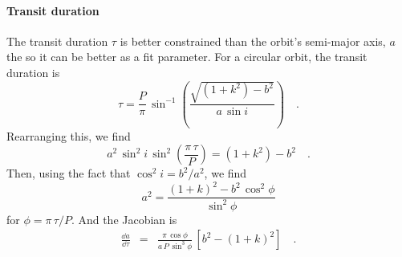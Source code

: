 \paragraph{Transit duration}
The transit duration $\tau$ is better constrained than the orbit's semi-major axis, $a$ the so it can be better as a fit parameter.
For a circular orbit, the transit duration is \citep{Winn:2010}
\begin{equation}
  \tau = \frac{P}{\pi}\,\sin^{-1}\left( \frac{\sqrt{(1 + k^2) - b^2}}{a\,\sin i} \right) \quad.
\end{equation}
Rearranging this, we find
\begin{equation}
  a^2\,\sin^2 i\,\sin^2\left(\frac{\pi\,\tau}{P}\right) = (1 + k^2) - b^2 \quad.
\end{equation}
Then, using the fact that $\cos^2 i = b^2 / a^2$, we find
\begin{equation}
  a^2 = \frac{(1 + k)^2 - b^2\,\cos^2\phi}{\sin^2\phi}
\end{equation}
for $\phi = \pi\,\tau / P$.
And the Jacobian is
\begin{eqnarray}
  \frac{\dd a}{\dd \tau} &=& \frac{\pi\,\cos \phi}{a\,P\,\sin^3 \phi}\,\left[b^2 - (1 + k)^2\right] \quad.
\end{eqnarray}

